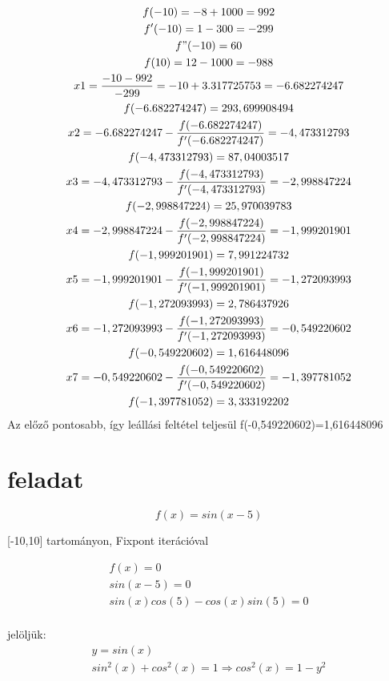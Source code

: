 \documentclass{article}
\begin{document}
\begin{multline}
f(-10) = -8+1000= 992\\
f'(-10) = 1 - 300 = -299\\
f"(-10) = 60\\
f(10) = 12-1000 = -988\\
x1 = \dfrac{-10 - 992 }{-299} = -10+3.317725753 = -6.682274247\\
f( -6.682274247)= 293,699908494\\
x2 = -6.682274247 - \dfrac{f(-6.682274247)}{ f'(-6.682274247)} = -4,473312793\\
f(-4,473312793)=87,04003517\\
x3 = - 4,473312793 - \dfrac{f(-4,473312793)}{f'(-4,473312793)}= -2,998847224\\
f(-2,998847224)=25,970039783\\
x4 = -2,998847224 - \dfrac{f(-2,998847224) }{f'(-2,998847224) }= -1,999201901\\
f(-1,999201901)=7,991224732\\
x5 = -1,999201901 - \dfrac{f(-1,999201901)}{f'(-1,999201901)}= -1,272093993\\
f(-1,272093993)=2,786437926\\
x6 = -1,272093993 - \dfrac{f(-1,272093993)}{f'(-1,272093993)} = -0,549220602\\
f(-0,549220602)=1,616448096\\
x7 = -0,549220602 - \dfrac{f(-0,549220602)}{f'(-0,549220602)} =-1,397781052\\
f(-1,397781052) = 3,333192202\\
\end{multline}
Az előző pontosabb, így leállási feltétel teljesül f(-0,549220602)=1,616448096

\section{feladat}
\begin{equation}
f(x)= sin(x-5)
\end{equation}

[-10,10] tartományon, Fixpont iterációval 

\begin{multline}
f(x)=0\\
sin(x-5)=0\\
sin(x)cos(5)-cos(x)sin(5)=0\\
\end{multline}

jelöljük:
\begin{multline}
y=sin(x)\\
sin^{2}(x)+cos^{2}(x)=1 \Rightarrow cos^{2}(x) = 1-y^{2}\\
\end{multline}
\end{document}
